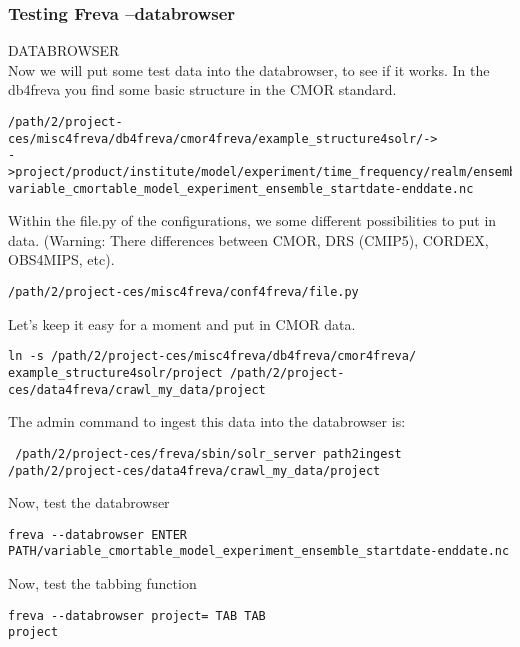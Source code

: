 \documentclass[a4paper,11pt]{ltxdoc}
\begin{document}
\subsubsection{Testing Freva --databrowser}
DATABROWSER \\
Now we will put some test data into the databrowser, to see if it works. In the db4freva you find some basic structure in the CMOR standard.
\begin{verbatim}/path/2/project-ces/misc4freva/db4freva/cmor4freva/example_structure4solr/->
->project/product/institute/model/experiment/time_frequency/realm/ensemble/
variable_cmortable_model_experiment_ensemble_startdate-enddate.nc \end{verbatim}
Within the file.py of the configurations, we some different possibilities to put in data. (Warning: There differences between CMOR, DRS (CMIP5), CORDEX, OBS4MIPS, etc).
\begin{verbatim}/path/2/project-ces/misc4freva/conf4freva/file.py\end{verbatim}
Let's keep it easy for a moment and put in CMOR data.\\
\begin{verbatim}ln -s /path/2/project-ces/misc4freva/db4freva/cmor4freva/
example_structure4solr/project /path/2/project-ces/data4freva/crawl_my_data/project \end{verbatim}
The admin command to ingest this data into the databrowser is:
\begin{verbatim} /path/2/project-ces/freva/sbin/solr_server path2ingest 
/path/2/project-ces/data4freva/crawl_my_data/project\end{verbatim}
Now, test the databrowser \\
\begin{verbatim}freva --databrowser ENTER
PATH/variable_cmortable_model_experiment_ensemble_startdate-enddate.nc\end{verbatim}
Now, test the tabbing function
\begin{verbatim}freva --databrowser project= TAB TAB
project\end{verbatim}
\end{document}
